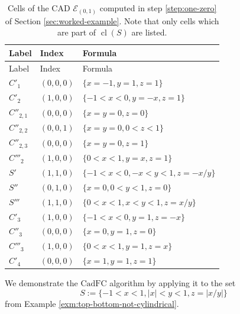 \documentclass[
]{book}
\theoremstyle{definition}
\theoremstyle{definition}
\theoremstyle{definition}
\theoremstyle{definition}
\theoremstyle{remark}
\begin{document}
\begin{longtable}[]{@{}lll@{}}
\caption{\label{tab:cells-of-e-refined} Cells of the CAD \(\mathcal{E}_{(0,1)}\) computed in step \ref{step:one-zero} of Section \ref{sec:worked-example}. Note that only cells which are part of \({\operatorname{cl} \left( S \right)}\) are listed.}\tabularnewline
\toprule
Label & Index & Formula\tabularnewline
\midrule
\endfirsthead
\toprule
Label & Index & Formula\tabularnewline
\midrule
\endhead
\({C'_1}\) & \((0,0,0)\) & \(\{ x = -1, y = 1, z = 1 \}\)\tabularnewline
\({C'_2}\) & \((1,0,0)\) & \(\{ -1 < x < 0, y = -x, z = 1 \}\)\tabularnewline
\({C''_{2,1}}\) & \((0,0,0)\) & \(\{ x = y = 0, z = 0 \}\)\tabularnewline
\({C''_{2,2}}\) & \((0,0,1)\) & \(\{ x = y = 0, 0 < z < 1 \}\)\tabularnewline
\({C''_{2,3}}\) & \((0,0,0)\) & \(\{ x = y = 0, z = 1 \}\)\tabularnewline
\({C'''_2}\) & \((1,0,0)\) & \(\{ 0 < x < 1, y = x, z = 1 \}\)\tabularnewline
\(S'\) & \((1,1,0)\) & \(\{ -1 < x < 0, -x < y < 1, z = -x/y \}\)\tabularnewline
\(S''\) & \((0,1,0)\) & \(\{ x = 0, 0 < y < 1, z = 0 \}\)\tabularnewline
\(S'''\) & \((1,1,0)\) & \(\{ 0 < x < 1, x < y < 1, z = x/y \}\)\tabularnewline
\(C'_3\) & \((1,0,0)\) & \(\{ -1 < x < 0, y = 1, z = -x \}\)\tabularnewline
\(C''_3\) & \((0,0,0)\) & \(\{ x = 0, y = 1, z = 0\}\)\tabularnewline
\(C'''_3\) & \((1,0,0)\) & \(\{ 0 < x < 1, y = 1, z = x \}\)\tabularnewline
\({C'_4}\) & \((0,0,0)\) & \(\{ x = 1, y = 1, z = 1 \}\)\tabularnewline
\bottomrule
\end{longtable}

We demonstrate the \(\mathrm{CadFC}\) algorithm by applying it to the set
\[
S := \{ -1 < x < 1, \vert x\vert <y <1, z=\vert x/y\vert \}
\]
from Example \ref{exm:top-bottom-not-cylindrical}.
\end{document}
